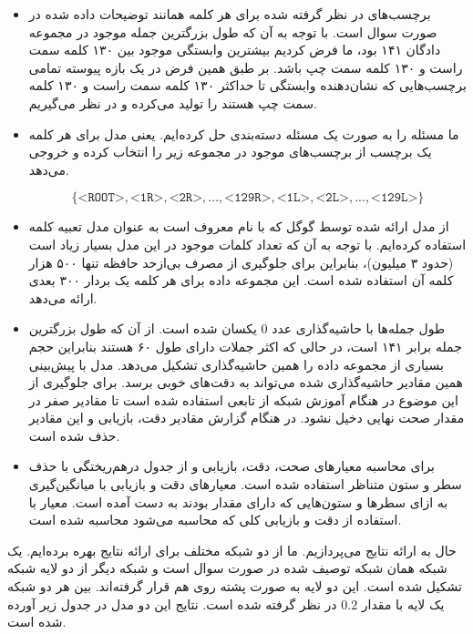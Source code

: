 \documentclass[12pt, a4paper]{article}
\begin{document}
\begin{itemize}
    \item برچسب‌های در نظر گرفته شده برای هر کلمه همانند توضیحات داده شده در صورت سوال است.
    با توجه به آن که طول بزرگترین جمله موجود در مجموعه دادگان ۱۴۱ بود، ما فرض کردیم بیشترین
    وابستگی موجود بین ۱۳۰ کلمه سمت راست و ۱۳۰ کلمه سمت چپ باشد. بر طبق همین فرض در یک بازه
    پیوسته تمامی برچسب‌هایی که نشان‌دهنده وابستگی تا حداکثر ۱۳۰ کلمه سمت راست و ۱۳۰ کلمه سمت چپ هستند
    را تولید می‌کرده و در نظر می‌گیریم.
    \item ما مسئله را به صورت یک مسئله دسته‌بندی حل کرده‌ایم. یعنی مدل برای هر کلمه یک برچسب از برچسب‌های
    موجود در مجموعه زیر را انتخاب کرده و خروجی می‌دهد.

    $$\{\texttt{<ROOT>}, \texttt{<1R>}, \texttt{<2R>}, ..., \texttt{<129R>}, \texttt{<1L>},
    \texttt{<2L>}, ..., \texttt{<129L>}\}$$

    \item از مدل  ارائه شده توسط گوگل که با نام 
    معروف است به عنوان مدل تعبیه کلمه استفاده کرده‌ایم. با توجه به آن که تعداد کلمات موجود در این مدل
    بسیار زیاد است (حدود ۳ میلیون)، بنابراین برای جلوگیری از مصرف بی‌ازحد حافظه تنها ۵۰۰ هزار کلمه
    آن استفاده شده است. این مجموعه داده برای هر کلمه یک بردار ۳۰۰ بعدی ارائه می‌دهد.
    \item طول جمله‌ها با حاشیه‌گذاری عدد $0$ یکسان شده است. از آن که طول بزرگترین جمله
    برابر ۱۴۱ است، در حالی که اکثر جملات دارای طول ۶۰ هستند بنابراین حجم بسیاری از مجموعه داده
    را همین حاشیه‌گذاری تشکیل می‌دهد. مدل با پیش‌بینی همین مقادیر حاشیه‌گذاری شده می‌تواند به دقت‌های
    خوبی برسد. برای جلوگیری از این موضوع در هنگام آموزش شبکه از تابعی استفاده شده است تا مقادیر
    صفر در مقدار صحت نهایی دخیل نشود. در هنگام گزارش مقادیر دقت، بازیابی و  این مقادیر
    حذف شده است.
    \item برای محاسبه معیار‌های صحت، دقت، بازیابی و  از جدول درهم‌ریختگی با حذف سطر و ستون متناظر
     استفاده شده است. معیار‌های دقت و بازیابی با میانگین‌گیری  به ازای
    سطر‌ها و ستون‌هایی که دارای مقدار بودند به دست آمده است. معیار  با استفاده از دقت و بازیابی
    کلی که محاسبه می‌شود محاسبه شده است.
\end{itemize}

حال به ارائه نتایج می‌پردازیم. ما از دو شبکه مختلف برای ارائه نتایج بهره برده‌ایم. یک شبکه همان
شبکه توصیف شده در صورت سوال است و شبکه دیگر از دو لایه شبکه  تشکیل شده است. این دو لایه
به صورت پشته روی هم قرار گرفته‌اند. بین هر دو شبکه  یک لایه  با مقدار $0.2$
در نظر گرفته شده است. نتایج این دو مدل در جدول زیر آورده شده است.
\end{document}
